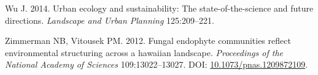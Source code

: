 \documentclass[fleqn,10pt,lineno]{wlpeerj} %
\newlength{\cslhangindent}
\newenvironment{CSLReferences}[2] %
 {%
  \setlength{\parindent}{0pt}
  \ifodd #1 \everypar{\setlength{\hangindent}{\cslhangindent}}\ignorespaces\fi
  \ifnum #2 > 0
  \setlength{\parskip}{#2\baselineskip}
  \fi
 }%
 {}
\begin{document}
\begin{CSLReferences}{1}{0}
\leavevmode{}%
Wu J. 2014. Urban ecology and sustainability: The state-of-the-science and future directions. \emph{Landscape and Urban Planning} 125:209--221.

\leavevmode{}%
Zimmerman NB, Vitousek PM. 2012. Fungal endophyte communities reflect environmental structuring across a hawaiian landscape. \emph{Proceedings of the National Academy of Sciences} 109:13022--13027. DOI: \href{https://doi.org/10.1073/pnas.1209872109}{10.1073/pnas.1209872109}.

\end{CSLReferences}
\end{document}
